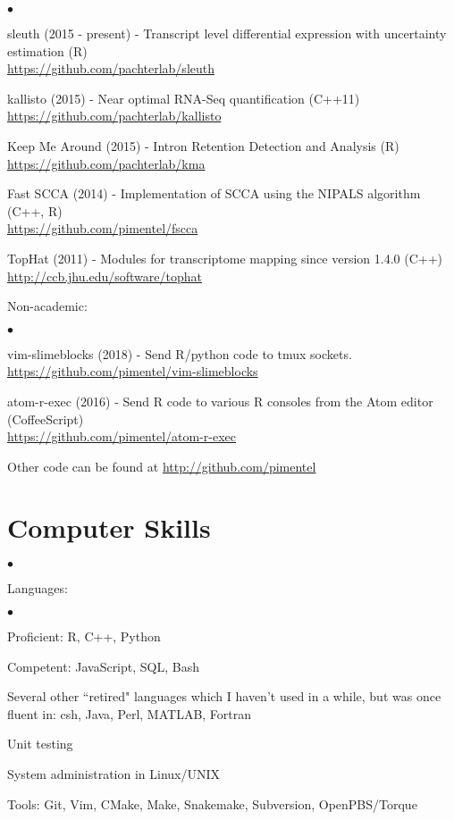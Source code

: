 \documentclass[overlapped]{res}
\newenvironment{list2}{
  \begin{list}{$\bullet$}{%
      \setlength{\itemsep}{0in}
      \setlength{\parsep}{0in} \setlength{\parskip}{0in}
      \setlength{\topsep}{0in} \setlength{\partopsep}{0in}
      \setlength{\leftmargin}{0.2in}}}{\end{list}}
\begin{document}
\begin{resume}
\begin{list2}
  \item sleuth (2015 - present) - Transcript level differential expression with uncertainty estimation (R)\\
    \url{https://github.com/pachterlab/sleuth}
  \item kallisto (2015) - Near optimal RNA-Seq quantification (C++11)\\
    \url{https://github.com/pachterlab/kallisto}
  \item Keep Me Around (2015) - Intron Retention Detection and Analysis (R) \\
    \url{https://github.com/pachterlab/kma}
  \item Fast SCCA (2014) - Implementation of SCCA using the NIPALS algorithm (C++, R) \\
    \url{https://github.com/pimentel/fscca}
  \item TopHat (2011) - Modules for transcriptome mapping since version 1.4.0 (C++) \\
    \url{http://ccb.jhu.edu/software/tophat}
\end{list2}

\vspace*{0.2cm}

Non-academic:

\begin{list2}
\item vim-slimeblocks (2018) - Send R/python code to tmux sockets.\\
  \url{https://github.com/pimentel/vim-slimeblocks}
\item atom-r-exec (2016) - Send R code to various R consoles from the Atom editor (CoffeeScript)\\
  \url{https://github.com/pimentel/atom-r-exec}
  \item Other code can be found at \url{http://github.com/pimentel}

\end{list2}

\section{\sc Computer Skills}
\begin{list2}
\item Languages:
  \begin{list2}
    \item Proficient: R, C++, Python
    \item Competent: JavaScript, SQL, Bash
  \end{list2}
\item Several other ``retired" languages which I haven't used in a while,
  but was once fluent in: csh, Java, Perl, MATLAB, Fortran
\item Unit testing
\item System administration in Linux/UNIX
\item Tools: Git, Vim, CMake, Make, Snakemake, Subversion, OpenPBS/Torque\\
\end{list2}
\vspace{-.65cm}


\end{resume}
\end{document}

